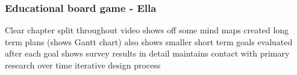 \subsubsection{Educational board game - Ella}
Clear chapter split throughout video
shows off some mind maps
created long term plans (shows Gantt chart)
also shows smaller short term goals 
evaluated after each goal 
shows survey results in detail 
maintains contact with primary research over time
iterative design process